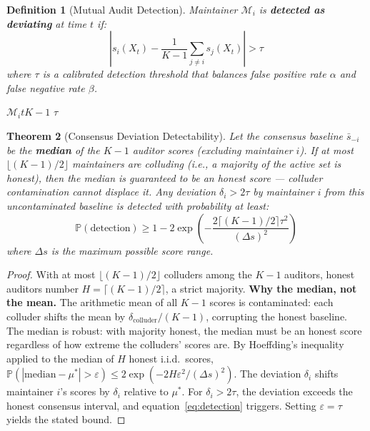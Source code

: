 \documentclass[12pt,a4paper]{article}
\newtheorem{theorem}{Theorem}[section]
\newtheorem{definition}[theorem]{Definition}
\theoremstyle{remark}
\newcommand{\Pbb}{\mathbb{P}}
\begin{document}
\begin{definition}[Mutual Audit Detection]
Maintainer $\mathcal{M}_i$ is \textbf{detected as deviating} at time $t$ if:
\begin{equation}\label{eq:detection}
    \left| s_i(X_t) - \frac{1}{K-1} \sum_{j \neq i} s_j(X_t) \right| > \tau
\end{equation}
where $\tau$ is a calibrated detection threshold that balances false positive
rate $\alpha$ and false negative rate $\beta$.
\end{definition}

\noindent\textbf{}
$\mathcal{M}_i$$t$$K-1$
$\tau$

\begin{theorem}[Consensus Deviation Detectability]\label{thm:detectability}
Let the consensus baseline $\bar{s}_{-i}$ be the \textbf{median} of the
$K-1$ auditor scores (excluding maintainer $i$). If at most
$\lfloor (K-1)/2 \rfloor$ maintainers are colluding (i.e., a majority
of the active set is honest), then the median is guaranteed to be an honest
score — colluder contamination cannot displace it. Any deviation
$\delta_i > 2\tau$ by maintainer $i$ from this uncontaminated baseline
is detected with probability at least:
\begin{equation}
    \Pbb(\text{detection}) \geq 1 - 2\exp\left(-\frac{2\lceil (K-1)/2 \rceil \tau^2}{(\Delta s)^2}\right)
\end{equation}
where $\Delta s$ is the maximum possible score range.
\end{theorem}

\begin{proof}
With at most $\lfloor (K-1)/2 \rfloor$ colluders among the $K-1$ auditors,
honest auditors number $H = \lceil (K-1)/2 \rceil$, a strict majority.
\textbf{Why the median, not the mean.} The arithmetic mean of all $K-1$ scores
is contaminated: each colluder shifts the mean by $\delta_{\text{colluder}}/(K-1)$,
corrupting the honest baseline. The median is robust: with majority honest,
the median must be an honest score regardless of how extreme the colluders'
scores are. By Hoeffding's inequality applied to the median of $H$ honest
i.i.d.\ scores,
$\Pbb(|\text{median} - \mu^*| > \varepsilon) \leq 2\exp(-2H\varepsilon^2/(\Delta s)^2)$.
The deviation $\delta_i$ shifts maintainer $i$'s scores by $\delta_i$ relative to
$\mu^*$. For $\delta_i > 2\tau$, the
deviation exceeds the honest consensus interval, and equation~\eqref{eq:detection}
triggers. Setting $\varepsilon = \tau$ yields the stated bound.
\end{proof}
\end{document}
